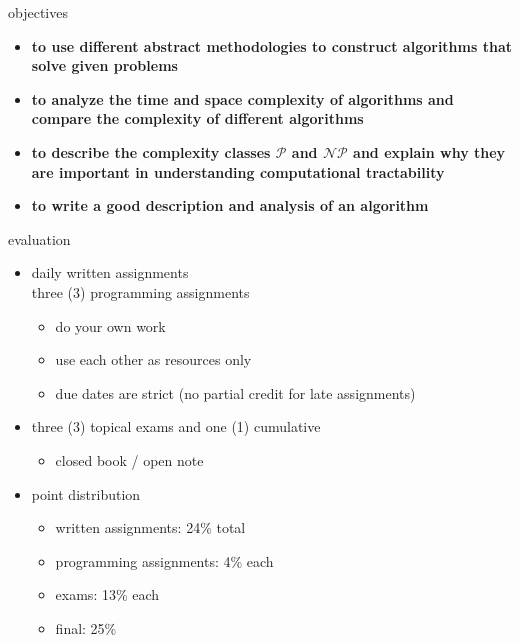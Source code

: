 \documentclass[10pt,t,usenames,dvipsnames]{beamer}
\begin{document}
  \begin{frame}{objectives}
    \begin{itemize}
      \setlength\itemsep{10pt}
      \item \textbf<2>{to use different abstract methodologies to construct
        algorithms that solve given problems}
      \item \textbf<3>{to analyze the time and space complexity of algorithms
        and compare the complexity of different algorithms}
      \item \textbf<4>{to describe the complexity classes $\mathcal{P}$ and
        $\mathcal{NP}$ and explain why they are important in understanding
        computational tractability}
      \item \textbf<5>{to write a good description and analysis of an algorithm}
    \end{itemize}
  \end{frame}

  \begin{frame}{evaluation}
    \begin{itemize}
      \setlength\itemsep{10pt}
      \item daily written assignments\\
            three (3) programming assignments
        \begin{itemize}%
          \item do your own work
          \item use each other as resources only
          \item due dates are strict (no partial credit for late assignments)
        \end{itemize}
      \item three (3) topical exams and one (1) cumulative
        \begin{itemize}%
          \item closed book / open note
        \end{itemize}
      \item point distribution
        \begin{itemize}
          \item written assignments: 24\% total
          \item programming assignments: 4\% each
          \item exams: 13\% each
          \item final: 25\%
        \end{itemize}
    \end{itemize}

  \end{frame}
\end{document}
